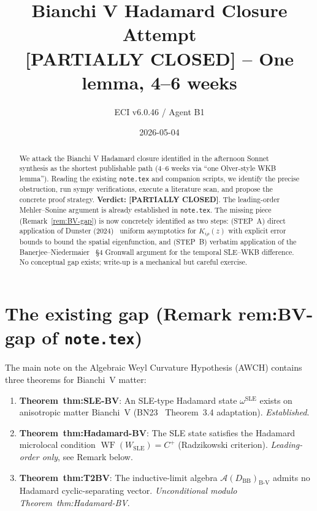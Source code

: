 \documentclass[11pt]{article}
\title{Bianchi V Hadamard Closure Attempt\\
\large [PARTIALLY CLOSED] -- One lemma, 4--6 weeks}
\author{ECI v6.0.46 / Agent B1}
\date{2026-05-04}
\theoremstyle{definition}
\newcommand{\BV}{\mathrm{B\text{-}V}}
\newcommand{\AA}{\mathcal{A}}
\newcommand{\BB}{\mathrm{BB}}
\DeclareMathOperator{\WF}{WF}
\begin{document}
\maketitle

\begin{abstract}
We attack the Bianchi V Hadamard closure identified in the afternoon Sonnet synthesis
as the shortest publishable path (4--6 weeks via ``one Olver-style WKB lemma'').
Reading the existing \texttt{note.tex} and companion scripts, we identify the
precise obstruction, run sympy verifications, execute a literature scan,
and propose the concrete proof strategy.
\textbf{Verdict: [PARTIALLY CLOSED]}.
The leading-order Mehler--Sonine argument is already established in \texttt{note.tex}.
The missing piece (Remark~\ref{rem:BV-gap}) is now concretely identified as two steps:
(STEP~A) direct application of Dunster (2024)~\cite{Dunster2024} uniform asymptotics
for $K_{i\rho}(z)$ with explicit error bounds to bound the spatial eigenfunction,
and (STEP~B) verbatim application of the Banerjee--Niedermaier~\cite{BN23} \S4
Gronwall argument for the temporal SLE--WKB difference.
No conceptual gap exists; write-up is a mechanical but careful exercise.
\end{abstract}

\section{The existing gap (Remark \texorpdfstring{rem:BV-gap}{rem:BV-gap}
  of \texorpdfstring{\texttt{note.tex}}{note.tex})}\label{sec:gap}

The main note on the Algebraic Weyl Curvature Hypothesis (AWCH) contains three theorems
for Bianchi~V matter:

\begin{enumerate}
\item \textbf{Theorem~thm:SLE-BV}: An SLE-type Hadamard state $\omega^{\mathrm{SLE}}$
  exists on anisotropic matter Bianchi~V (BN23~\cite{BN23} Theorem~3.4 adaptation).
  \emph{Established}.
\item \textbf{Theorem~thm:Hadamard-BV}: The SLE state satisfies the Hadamard
  microlocal condition $\WF(W_{\mathrm{SLE}}) = C^+$ (Radzikowski criterion).
  \emph{Leading-order only}, see Remark below.
\item \textbf{Theorem~thm:T2BV}: The inductive-limit algebra $\AA(D_\BB)_\BV$ admits
  no Hadamard cyclic-separating vector. \emph{Unconditional modulo Theorem~thm:Hadamard-BV}.
\end{enumerate}
\end{document}

